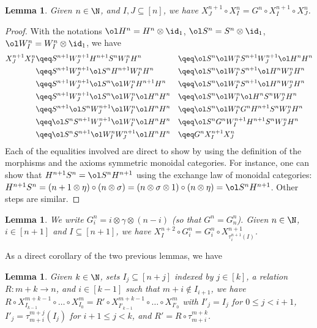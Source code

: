 \documentclass[submission,copyright,creativecommons]{eptcs}
\newtheorem{lemma}[theorem]{Lemma}
\theoremstyle{definition}
\theoremstyle{remark}
\renewcommand{\leq}{\leqslant}
\begin{document}
\begin{lemma}
  Given $n\in\N$, and $I,J\subseteq [n]$, we have $X^{n+1}_J\circ X^n_I=G^n\circ
  X^{n+1}_I\circ X^n_J$.
\end{lemma}
\begin{proof}
  With the notations $\ol H^n=H^n\otimes\id_1$, $\ol S^n=S^n\otimes\id_1$, $\ol
  W^n_I=W^n_I\otimes\id_1$, we have
  \begin{align*}
    X^{n+1}_JX^n_I
    &\qeq S^{n+1}W^{n+1}_JH^{n+1}S^nW^n_IH^n&&\qeq \ol S^n\ol W^n_IS^{n+1}W^{n+1}_J\ol H^nH^n\\
    &\qeq S^{n+1}W^{n+1}_J\ol S^nH^{n+1}W^n_IH^n&&\qeq \ol S^n\ol W^n_IS^{n+1}\ol H^nW^n_JH^n\\
    &\qeq S^{n+1}W^{n+1}_J\ol S^n\ol W^n_IH^{n+1}H^n&&\qeq \ol S^n\ol W^n_IS^{n+1}\ol H^nW^n_JH^n\\
    &\qeq S^{n+1}W^{n+1}_J\ol S^n\ol W^n_I\ol H^nH^n&&\qeq \ol S^n\ol W^n_I\ol H^nS^nW^n_JH^n\\
    &\qeq S^{n+1}\ol S^nW^{n+1}_J\ol W^n_I\ol H^nH^n&&\qeq \ol S^n\ol W^n_IG^nH^{n+1}S^nW^n_JH^n\\
    &\qeq \ol S^nS^{n+1}W^{n+1}_J\ol W^n_I\ol H^nH^n&&\qeq \ol S^nG^nW^{n+1}_IH^{n+1}S^nW^n_JH^n\\
    &\qeq \ol S^nS^{n+1}\ol W^n_IW^{n+1}_J\ol H^nH^n&&\qeq G^nX^{n+1}_IX^n_J
  \end{align*}
Each of the equalities involved are direct to show by using the definition of
  the morphisms and the axioms symmetric monoidal categories.
For instance, one can show that $H^{n+1}S^n=\ol S^nH^{n+1}$ using the exchange
  law of monoidal categories: $
  H^{n+1}S^n=(n+1\otimes\eta)\circ(n\otimes\sigma)=(n\otimes\sigma\otimes
  1)\circ(n\otimes\eta)=\ol S^nH^{n+1} $.  Other steps are similar.
\end{proof}

\begin{lemma}
  We write $G^n_i=i\otimes\gamma\otimes(n-i)$ (so that $G^n=G^n_n$). Given
  $n\in\N$, $i\in[n+1]$ and $I\subseteq[n+1]$, we have
  $X^{n+2}_I\circ G^n_i=G^n_i\circ X^{n+1}_{\tau^{n+1}_i(I)}$.
\end{lemma}

\noindent
As a direct corollary of the two previous lemmas, we have

\begin{lemma}
  \label{lemma:TP-switch}
  Given $k\in\N$, sets $I_j\subseteq[n+j]$ indexed by $j\in[k]$, a relation
  $R:m+k\to n$, and $i\in[k-1]$ such that $m+i\not\in I_{i+1}$, we have $R\circ
  X^{m+k-1}_{I_{k-1}}\circ\ldots\circ X^m_{I_0} = R'\circ
  X^{m+k-1}_{I'_{k-1}}\circ\ldots\circ X^m_{I'_0}$ with $I'_j=I_j$ for $0\leq
  j<i+1$, $I'_j=\tau^{m+j}_{m+i}(I_j)$ for $i+1\leq j<k$, and
  $R'=R\circ\tau^{m+k}_{m+i}$.
\end{lemma}
\end{document}
